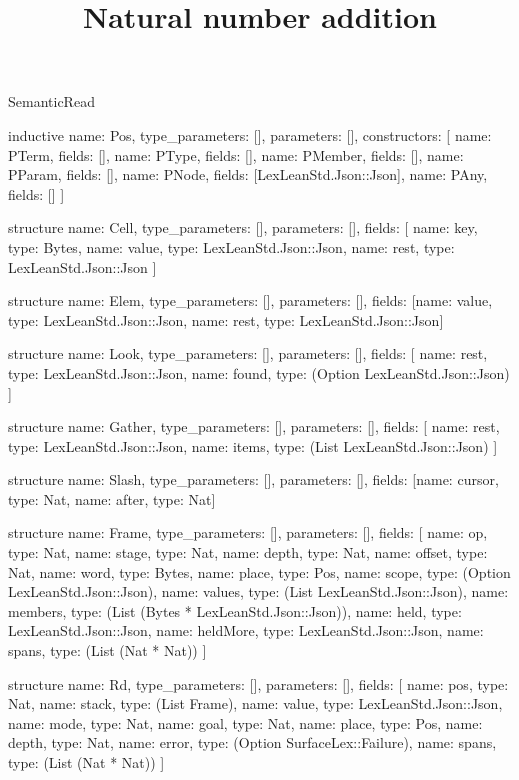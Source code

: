 \begin{lexlean}{SemanticRead}
\title{Natural number addition}
\begin{semanticmodule}
inductive{
  name: Pos,
  type_parameters: [],
  parameters: [],
  constructors: [
    {name: PTerm, fields: []},
    {name: PType, fields: []},
    {name: PMember, fields: []},
    {name: PParam, fields: []},
    {name: PNode, fields: [LexLeanStd.Json::Json]},
    {name: PAny, fields: []}
  ]
}

structure{
  name: Cell,
  type_parameters: [],
  parameters: [],
  fields: [
    {name: key, type: Bytes},
    {name: value, type: LexLeanStd.Json::Json},
    {name: rest, type: LexLeanStd.Json::Json}
  ]
}

structure{
  name: Elem,
  type_parameters: [],
  parameters: [],
  fields: [{name: value, type: LexLeanStd.Json::Json}, {name: rest, type: LexLeanStd.Json::Json}]
}

structure{
  name: Look,
  type_parameters: [],
  parameters: [],
  fields: [
    {name: rest, type: LexLeanStd.Json::Json},
    {name: found, type: (Option LexLeanStd.Json::Json)}
  ]
}

structure{
  name: Gather,
  type_parameters: [],
  parameters: [],
  fields: [
    {name: rest, type: LexLeanStd.Json::Json},
    {name: items, type: (List LexLeanStd.Json::Json)}
  ]
}

structure{
  name: Slash,
  type_parameters: [],
  parameters: [],
  fields: [{name: cursor, type: Nat}, {name: after, type: Nat}]
}

structure{
  name: Frame,
  type_parameters: [],
  parameters: [],
  fields: [
    {name: op, type: Nat},
    {name: stage, type: Nat},
    {name: depth, type: Nat},
    {name: offset, type: Nat},
    {name: word, type: Bytes},
    {name: place, type: Pos},
    {name: scope, type: (Option LexLeanStd.Json::Json)},
    {name: values, type: (List LexLeanStd.Json::Json)},
    {name: members, type: (List (Bytes * LexLeanStd.Json::Json))},
    {name: held, type: LexLeanStd.Json::Json},
    {name: heldMore, type: LexLeanStd.Json::Json},
    {name: spans, type: (List (Nat * Nat))}
  ]
}

structure{
  name: Rd,
  type_parameters: [],
  parameters: [],
  fields: [
    {name: pos, type: Nat},
    {name: stack, type: (List Frame)},
    {name: value, type: LexLeanStd.Json::Json},
    {name: mode, type: Nat},
    {name: goal, type: Nat},
    {name: place, type: Pos},
    {name: depth, type: Nat},
    {name: error, type: (Option SurfaceLex::Failure)},
    {name: spans, type: (List (Nat * Nat))}
  ]
}


\end{semanticmodule}
\end{lexlean}
